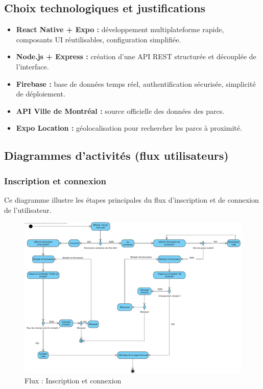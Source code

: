 \documentclass[12pt,a4paper]{article}
\begin{document}
\subsection{Choix technologiques et justifications}

\begin{itemize}
  \item \textbf{React Native + Expo :} développement multiplateforme rapide, composants UI réutilisables, configuration simplifiée.
  \item \textbf{Node.js + Express :} création d'une API REST structurée et découplée de l'interface.
  \item \textbf{Firebase :} base de données temps réel, authentification sécurisée, simplicité de déploiement.
  \item \textbf{API Ville de Montréal :} source officielle des données des parcs.
  \item \textbf{Expo Location :} géolocalisation pour rechercher les parcs à proximité.
\end{itemize}

\subsection{Diagrammes d'activités (flux utilisateurs)}

\subsubsection{Inscription et connexion}

Ce diagramme illustre les étapes principales du flux d'inscription et de connexion de l'utilisateur.

\begin{figure}[h!]
  \centering
  \includegraphics[width=0.9\linewidth]{attachments/Inscription_Connexion.pdf}
  \caption{Flux : Inscription et connexion}
\end{figure}
\end{document}
